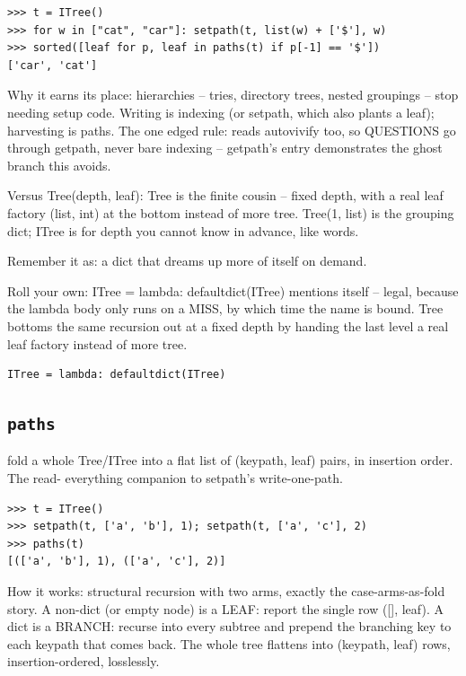 \documentclass[10pt,letterpaper]{book}
\begin{document}
\begin{lstlisting}[style=ex]
>>> t = ITree()
>>> for w in ["cat", "car"]: setpath(t, list(w) + ['$'], w)
>>> sorted([leaf for p, leaf in paths(t) if p[-1] == '$'])
['car', 'cat']
\end{lstlisting}

Why it earns its place: hierarchies -- tries, directory trees, nested groupings -- stop needing setup code. Writing is indexing (or setpath, which also plants a leaf); harvesting is paths. The one edged rule: reads autovivify too, so QUESTIONS go through getpath, never bare indexing -- getpath's entry demonstrates the ghost branch this avoids.


Versus Tree(depth, leaf): Tree is the finite cousin -- fixed depth, with a real leaf factory (list, int) at the bottom instead of more tree. Tree(1, list) is the grouping dict; ITree is for depth you cannot know in advance, like words.


Remember it as: a dict that dreams up more of itself on demand.


Roll your own: ITree = lambda: defaultdict(ITree) mentions itself -- legal, because the lambda body only runs on a MISS, by which time the name is bound. Tree bottoms the same recursion out at a fixed depth by handing the last level a real leaf factory instead of more tree.

\begin{lstlisting}[style=ex]
ITree = lambda: defaultdict(ITree)
\end{lstlisting}

\subsection{\texttt{paths}}\label{def:paths}
fold a whole Tree/ITree into a flat list of (keypath, leaf) pairs, in insertion order. The read- everything companion to setpath's write-one-path.
\begin{lstlisting}[style=ex]
>>> t = ITree()
>>> setpath(t, ['a', 'b'], 1); setpath(t, ['a', 'c'], 2)
>>> paths(t)
[(['a', 'b'], 1), (['a', 'c'], 2)]
\end{lstlisting}

How it works: structural recursion with two arms, exactly the case-arms-as-fold story. A non-dict (or empty node) is a LEAF: report the single row ([], leaf). A dict is a BRANCH: recurse into every subtree and prepend the branching key to each keypath that comes back. The whole tree flattens into (keypath, leaf) rows, insertion-ordered, losslessly.
\end{document}

